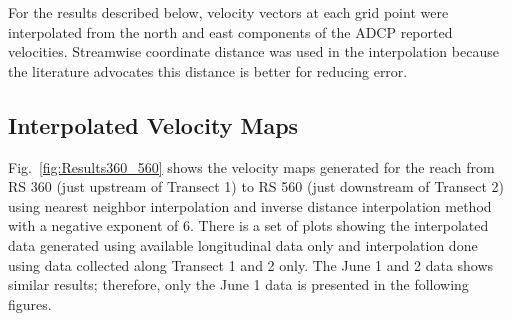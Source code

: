 \documentclass[Journal,letterpaper,BackFigs]{ascelike-new}
\begin{document}
For the results described below, velocity vectors at each grid point were interpolated from the north and east components of the ADCP reported velocities. Streamwise coordinate distance was used in the interpolation because the literature advocates this distance is better for reducing error.

\subsection{Interpolated Velocity Maps}
Fig.~\ref{fig:Results360_560} shows the velocity maps generated for the reach from RS 360 (just upstream of Transect 1) to RS 560 (just downstream of Transect 2) using nearest neighbor interpolation and inverse distance interpolation method with a negative exponent of 6. There is a set of plots showing the interpolated data generated using available longitudinal data only and interpolation done using data collected along Transect 1 and 2 only. The June 1 and 2 data shows similar results; therefore, only the June 1 data is presented in the following figures.
\end{document}
